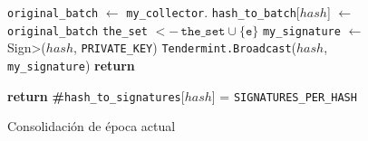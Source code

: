   \begin{figure}[t!]
  \begin{adjustbox}{minipage=[t]{\columnwidth}}
    \begin{algorithm}[H]
      \renewcommand{\thealgorithm}{ABCI Haschain - Parte 2}         
      \caption{\small Consolidación de época actual}%
      \label{alg:abci-hash2}%
      \small
      \begin{algorithmic}[1]
            	\label{alg:hash_revert}
                \State \texttt{original\_batch} $\leftarrow$ \texttt{my\_collector}.
					\State \texttt{hash\_to\_batch}[$hash$]  $\leftarrow$ \texttt{original\_batch}     
									\State \texttt{the\_set} \(<- \, \texttt{the\_set} \cup \{\texttt{e}\}\)
								\EndIf
							\EndFor
                			\State \texttt{my\_signature} $\leftarrow$ \<Sign>($hash$, \texttt{PRIVATE\_KEY})
                			\State \texttt{Tendermint.Broadcast}($hash$, \texttt{my\_signature})
					\EndIf   
				\EndIf             	
                	\State \textbf{return}
            \EndFunction
            
             \label{alg:hash_consolidated}
            		\State \textbf{return} \textbf{\#}\texttt{hash\_to\_signatures}[$hash$] = \texttt{SIGNATURES\_PER\_HASH}
            \EndFunction

        \end{algorithmic}
      \end{algorithm}
	\end{adjustbox}
  \end{figure}
  